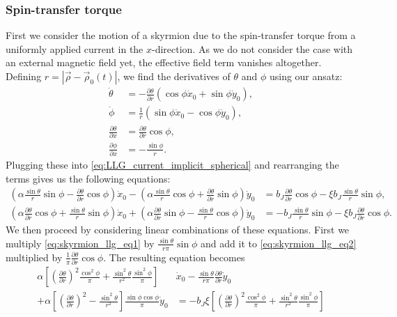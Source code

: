 \documentclass[1p]{elsarticle}		%
\numberwithin{equation}{section}
\begin{document}
\subsubsection{Spin-transfer torque}
First we consider the motion of a skyrmion due to the spin-transfer torque from a uniformly applied current in the $x$-direction. As we do not consider the case with an external magnetic field yet, the effective field term vanishes altogether. Defining $r = |\vec{\rho}-\vec{\rho}_0(t)|$, we find the derivatives of $\theta$ and $\phi$ using our ansatz:
\begin{align}
\dot{\theta} &= -\frac{\partial\theta}{\partial r}(\cos\phi\dot{x}_0+\sin\phi\dot{y}_0), \\
\dot{\phi} &= \frac{1}{r}(\sin\phi\dot{x}_0-\cos\phi\dot{y}_0), \\
\frac{\partial \theta}{\partial x} &= \frac{\partial\theta}{\partial r} \cos\phi,\\
\frac{\partial\phi}{\partial x} &= -\frac{\sin\phi}{r}.
\end{align}
Plugging these into \eqref{eq:LLG_current_implicit_spherical} and rearranging the terms gives us the following equations:
\begin{align}
(\alpha\frac{\sin\theta}{r}\sin\phi-\frac{\partial\theta}{\partial r}\cos\phi)\dot{x}_0 - (\alpha\frac{\sin\theta}{r}\cos\phi+\frac{\partial\theta}{\partial r}\sin\phi)\dot{y}_0 &= b_J \frac{\partial\theta}{\partial r}\cos\phi - \xi b_J \frac{\sin\theta}{r}\sin\phi, \label{eq:skyrmion_llg_eq1}\\
(\alpha\frac{\partial\theta}{\partial r}\cos\phi + \frac{\sin\theta}{r}\sin\phi)\dot{x}_0 + (\alpha\frac{\partial\theta}{\partial r}\sin\phi - \frac{\sin\theta}{r}\cos\phi)\dot{y}_0 &= -b_J\frac{\sin\theta}{r}\sin\phi - \xi b_J \frac{\partial\theta}{\partial r}\cos\phi. \label{eq:skyrmion_llg_eq2}
\end{align}
We then proceed by considering linear combinations of these equations. First we multiply \eqref{eq:skyrmion_llg_eq1} by $\frac{\sin\theta}{r \pi}\sin\phi$ and add it to \eqref{eq:skyrmion_llg_eq2} multiplied by $\frac{1}{\pi}\frac{\partial\theta}{\partial r}\cos\phi$. The resulting equation becomes
\begin{align}
\nonumber \alpha\left[ (\frac{\partial\theta}{\partial r})^2\frac{\cos^2\phi}{\pi} + \frac{\sin^2\theta}{r^2}\frac{\sin^2\phi}{\pi}\right] &\dot{x}_0 - \frac{\sin\theta}{r \pi}\frac{\partial\theta}{\partial r}\dot{y}_0 \\
+ \alpha \left[(\frac{\partial\theta}{\partial r})^2-\frac{\sin^2\theta}{r^2}\right]\frac{\sin\phi\cos\phi}{\pi}\dot{y}_0
&= -b_J\xi\left[ (\frac{\partial\theta}{\partial r})^2\frac{\cos^2\phi}{\pi} + \frac{\sin^2\theta}{r^2}\frac{\sin^2\phi}{\pi}\right]
\end{align}
\end{document}
